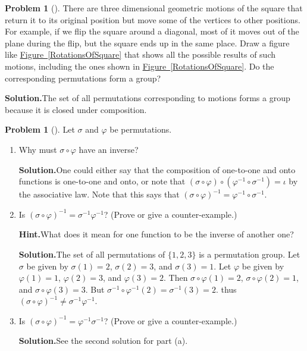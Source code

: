 \documentclass[10pt,]{book}
\theoremstyle{plain}
\theoremstyle{definition}
\newtheorem{activity}[project]{Problem}
\theoremstyle{definition}
\numberwithin{equation}{chapter}
\begin{document}
\begin{activity}[]\label{dihedral1}
There are three dimensional geometric motions of the square that return it to its original position but move some of the vertices to other positions. For example, if we flip the square around a diagonal, most of it moves out of the plane during the flip, but the square ends up in the same place. Draw a figure like \hyperref[RotationsOfSquare]{Figure~\ref{RotationsOfSquare}} that shows all the possible results of such motions, including the ones shown in \hyperref[RotationsOfSquare]{Figure~\ref{RotationsOfSquare}}. Do the corresponding permutations form a group?%
\par\medskip\noindent%
\textbf{Solution.}\quad The set of all permutations corresponding to motions forms a group because it is closed under composition.%
\end{activity}
\begin{activity}[]\label{activity-256}
Let \(\sigma\) and \(\varphi\) be permutations.%
\begin{enumerate}[font=\bfseries,label=(\alph*),ref=\alph*]
\item\label{task-186} Why must \(\sigma\circ\varphi\) have an inverse?%
\par\medskip\noindent%
\textbf{Solution.}\quad One could either say that the composition of one-to-one and onto functions is one-to-one and onto, or note that \((\sigma\circ\varphi)\circ(\varphi^{-1}\circ \sigma^{-1}) =\iota\) by the associative law. Note that this says that \((\sigma \circ \varphi)^{-1}= \varphi^{-1}\circ \sigma^{-1}\).%
\item\label{task-187} Is \((\sigma\circ\varphi)^{-1}=\sigma^{-1}\varphi^{-1}\)? (Prove or give a counter-example.)%
\par\medskip\noindent%
\textbf{Hint.}\quad What does it mean for one function to be the inverse of another one?%
\par\medskip\noindent%
\textbf{Solution.}\quad The set of all permutations of \(\{1,2,3\}\) is a permutation group.  Let \(\sigma\) be given by \(\sigma(1) = 2\), \(\sigma(2) = 3\), and \(\sigma(3) = 1\).  Let \(\varphi\) be given by \(\varphi(1) = 1\), \(\varphi(2) = 3\), and \(\varphi(3) = 2\).  Then \(\sigma \circ \varphi(1) = 2\), \(\sigma\circ\varphi(2) = 1\), and \(\sigma\circ\varphi(3) = 3\). But \(\sigma^{-1} \circ \varphi^{-1}(2) = \sigma^{-1}(3) = 2\).  thus \((\sigma\circ\varphi)^{-1}\ne
\sigma^{-1}\varphi^{-1}\).%
\item\label{task-188} Is \((\sigma\circ\varphi)^{-1}= \varphi^{-1}\sigma^{-1}\)? (Prove or give a counter-example.)%
\par\medskip\noindent%
\textbf{Solution.}\quad See the second solution for part (a).%
\end{enumerate}
\end{activity}
\end{document}
